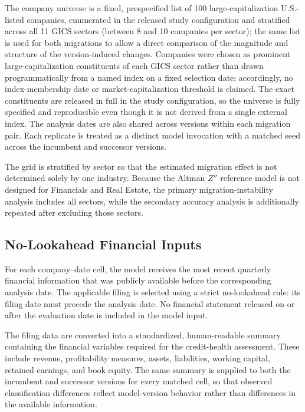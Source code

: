\documentclass[11pt]{article}
\begin{document}
The company universe is a fixed, prespecified list of 100 large-capitalization U.S.-listed companies, enumerated in the released study configuration and stratified across all 11 GICS sectors (between 8 and 10 companies per sector); the same list is used for both migrations to allow a direct comparison of the magnitude and structure of the version-induced changes. Companies were chosen as prominent large-capitalization constituents of each GICS sector rather than drawn programmatically from a named index on a fixed selection date; accordingly, no index-membership date or market-capitalization threshold is claimed. The exact constituents are released in full in the study configuration, so the universe is fully specified and reproducible even though it is not derived from a single external index. The analysis dates are also shared across versions within each migration pair. Each replicate is treated as a distinct model invocation with a matched seed across the incumbent and successor versions.

The grid is stratified by sector so that the estimated migration effect is not determined solely by one industry. Because the Altman $Z''$ reference model is not designed for Financials and Real Estate, the primary migration-instability analysis includes all sectors, while the secondary accuracy analysis is additionally repeated after excluding those sectors.

\subsection{No-Lookahead Financial Inputs}
For each company--date cell, the model receives the most recent quarterly financial information that was publicly available before the corresponding analysis date. The applicable filing is selected using a strict no-lookahead rule: its filing date must precede the analysis date. No financial statement released on or after the evaluation date is included in the model input.

The filing data are converted into a standardized, human-readable summary containing the financial variables required for the credit-health assessment. These include revenue, profitability measures, assets, liabilities, working capital, retained earnings, and book equity. The same summary is supplied to both the incumbent and successor versions for every matched cell, so that observed classification differences reflect model-version behavior rather than differences in the available information.
\end{document}
